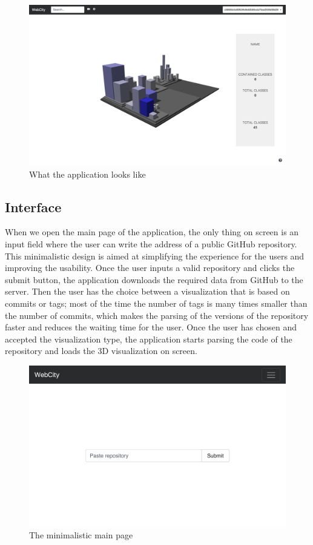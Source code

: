 \documentclass[]{usiinfbachelorproject}
\begin{document}
\begin{figure} [H]
\centering
\includegraphics[width=1\textwidth]{pictures/app.png}
\caption{What the application looks like}
\label{fig:app}
\end{figure}

\subsection{Interface} \label{User Interface and Features}

When we open the main page of the application, the only thing on screen is an input field where the user can write the address of a public GitHub repository. This minimalistic design is aimed at simplifying the experience for the users and improving the usability. Once the user inputs a valid repository and clicks the submit button, the application downloads the required data from GitHub to the server. Then the user has the choice between a visualization that is based on commits or tags; most of the time the number of tags is many times smaller than the number of commits, which makes the parsing of the versions of the repository faster and reduces the waiting time for the user. Once the user has chosen and accepted the visualization type, the application starts parsing the code of the repository and loads the 3D visualization on screen.

\begin{figure}[H]
\centering
  \includegraphics[width=.6\textwidth]{pictures/interface.png}
  \caption{The minimalistic main page}
  \label{fig:interface}
\end{figure}
\end{document}
